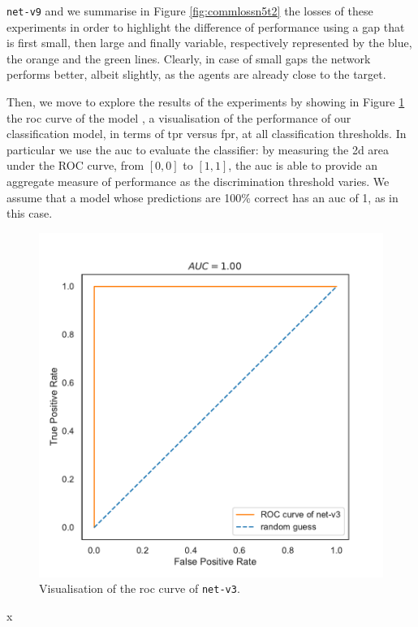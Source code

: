 \noindent
\texttt{net-v9} and we summarise in Figure \ref{fig:commlossn5t2} the losses of 
these experiments in order to highlight the difference of performance using a gap 
that is first small, then large and finally variable, respectively represented by the 
blue, the orange and the green lines.
Clearly, in case of small gaps the network performs better, albeit slightly, as the 
agents are already close to the target.

Then, we move to explore the results of the experiments by showing in Figure 
\ref{fig:net-v3auc} the \gls{roc} curve of the model 
\cite[][]{fawcett2006introduction}, a visualisation of the performance of our 
classification model, in terms of \gls{tpr} versus \gls{fpr}, at all classification 
thresholds.
In particular we use the \gls{auc} to evaluate the classifier: by measuring the 
\gls{2d} area under the ROC curve, from $[0, 0]$ to $[1, 1]$, the \gls{auc} is able 
to provide an aggregate measure of performance as the discrimination threshold 
varies.
We assume that a model whose predictions are 100\% correct has an \gls{auc} of 
1, as in this case.
\begin{figure}[!htb]
	\centering
	\includegraphics[width=.5\textwidth]{contents/images/net-v3/roc-net-v3(a)}%
	\caption[Evaluation of the ROC of \texttt{net-v3}.]{Visualisation of the 
		\gls{roc} curve of \texttt{net-v3}.}
	\label{fig:net-v3auc}
\end{figure}x

